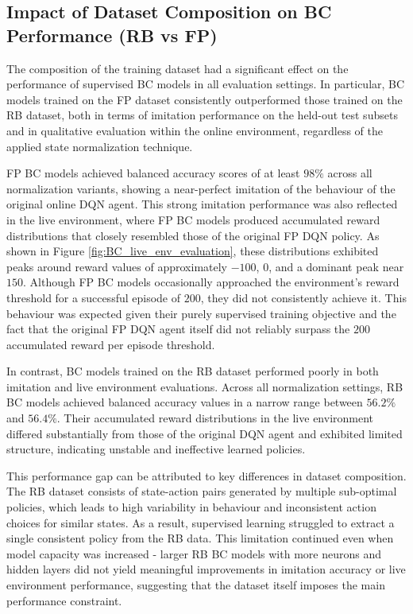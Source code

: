 









\subsection{Impact of Dataset Composition on BC Performance (RB vs FP)}
The composition of the training dataset had a significant effect on the performance of supervised BC models in all evaluation settings. In particular, BC models trained on the FP dataset consistently outperformed those trained on the RB dataset, both in terms of imitation performance on the held-out test subsets and in qualitative evaluation within the online environment, regardless of the applied state normalization technique.

FP BC models achieved balanced accuracy scores of at least $98\%$ across all normalization variants, showing a near-perfect imitation of the behaviour of the original online DQN agent. This strong imitation performance was also reflected in the live environment, where FP BC models produced accumulated reward distributions that closely resembled those of the original FP DQN policy. As shown in Figure \ref{fig:BC_live_env_evaluation}, these distributions exhibited peaks around reward values of approximately $-100$, $0$, and a dominant peak near $150$. Although FP BC models occasionally approached the environment’s reward threshold for a successful episode of $200$, they did not consistently achieve it. This behaviour was expected given their purely supervised training objective and the fact that the original FP DQN agent itself did not reliably surpass the $200$ accumulated reward per episode threshold.

In contrast, BC models trained on the RB dataset performed poorly in both imitation and live environment evaluations. Across all normalization settings, RB BC models achieved balanced accuracy values in a narrow range between $56.2\%$ and $56.4\%$. Their accumulated reward distributions in the live environment differed substantially from those of the original DQN agent and exhibited limited structure, indicating unstable and ineffective learned policies.

This performance gap can be attributed to key differences in dataset composition. The RB dataset consists of state-action pairs generated by multiple sub-optimal policies, which leads to high variability in behaviour and inconsistent action choices for similar states. As a result, supervised learning struggled to extract a single consistent policy from the RB data. This limitation continued even when model capacity was increased - larger RB BC models with more neurons and hidden layers did not yield meaningful improvements in imitation accuracy or live environment performance, suggesting that the dataset itself imposes the main performance constraint.

